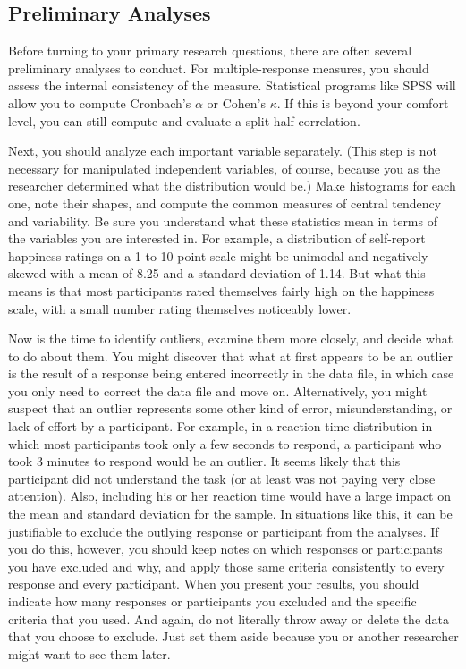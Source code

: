 \subsection{Preliminary Analyses}

Before turning to your primary research questions, there are often several preliminary analyses to conduct. For multiple-response measures, you should assess the internal consistency of the measure. Statistical programs like SPSS will allow you to compute Cronbach's $\alpha$ or Cohen's $\kappa$. If this is beyond your comfort level, you can still compute and evaluate a split-half correlation.

Next, you should analyze each important variable separately. (This step is not necessary for manipulated independent variables, of course, because you as the researcher determined what the distribution would be.) Make histograms for each one, note their shapes, and compute the common measures of central tendency and variability. Be sure you understand what these statistics mean in terms of the variables you are interested in. For example, a distribution of self-report happiness ratings on a 1-to-10-point scale might be unimodal and negatively skewed with a mean of 8.25 and a standard deviation of 1.14. But what this means is that most participants rated themselves fairly high on the happiness scale, with a small number rating themselves noticeably lower.

Now is the time to identify outliers, examine them more closely, and decide what to do about them. You might discover that what at first appears to be an outlier is the result of a response being entered incorrectly in the data file, in which case you only need to correct the data file and move on. Alternatively, you might suspect that an outlier represents some other kind of error, misunderstanding, or lack of effort by a participant. For example, in a reaction time distribution in which most participants took only a few seconds to respond, a participant who took 3 minutes to respond would be an outlier. It seems likely that this participant did not understand the task (or at least was not paying very close attention). Also, including his or her reaction time would have a large impact on the mean and standard deviation for the sample. In situations like this, it can be justifiable to exclude the outlying response or participant from the analyses. If you do this, however, you should keep notes on which responses or participants you have excluded and why, and apply those same criteria consistently to every response and every participant. When you present your results, you should indicate how many responses or participants you excluded and the specific criteria that you used. And again, do not literally throw away or delete the data that you choose to exclude. Just set them aside because you or another researcher might want to see them later.

